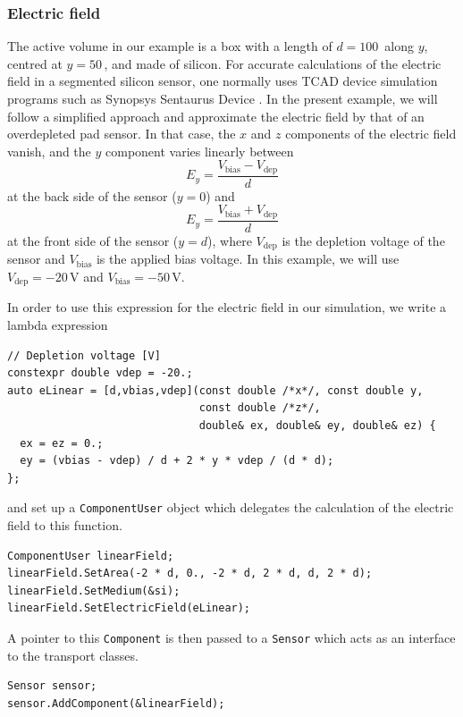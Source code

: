 \subsubsection{Electric field}
The active volume in our example is a box with a length of $d = 100$\, along $y$, centred at $y = 50$\,, and made of silicon. 
For accurate calculations of the electric field in a segmented silicon sensor, 
one normally uses TCAD device simulation programs such as 
Synopsys Sentaurus Device \cite{Synopsys}. 
In the present example, we will follow a simplified approach 
and approximate the electric field by that of an overdepleted pad sensor. 
In that case, the $x$ and $z$ components of the electric field vanish, 
and the $y$ component varies linearly between
\begin{equation*}
E_y = \frac{V_{\text{bias}} - V_{\text{dep}}}{d}
\end{equation*}
at the back side of the sensor ($y = 0$) and
\begin{equation*}
E_y = \frac{V_{\text{bias}} + V_{\text{dep}}}{d}
\end{equation*}
at the front side of the sensor ($y = d$), where 
$V_{\text{dep}}$ is the depletion voltage of the sensor and 
$V_{\text{bias}}$ is the applied bias voltage. 
In this example, we will use $V_{\text{dep}} = -20$\,V and 
$V_{\text{bias}} = -50$\,V.

In order to use this expression for the electric field in our simulation, 
we write a lambda expression
\begin{lstlisting}
// Depletion voltage [V]
constexpr double vdep = -20.;
auto eLinear = [d,vbias,vdep](const double /*x*/, const double y,
                              const double /*z*/,
                              double& ex, double& ey, double& ez) {
  ex = ez = 0.;
  ey = (vbias - vdep) / d + 2 * y * vdep / (d * d);
};
\end{lstlisting}
and set up a \texttt{ComponentUser} object 
which delegates the calculation of the electric field to this function.
\begin{lstlisting}
ComponentUser linearField;
linearField.SetArea(-2 * d, 0., -2 * d, 2 * d, d, 2 * d);
linearField.SetMedium(&si);
linearField.SetElectricField(eLinear);
\end{lstlisting}
A pointer to this \texttt{Component} is then passed to a \texttt{Sensor}
which acts as an interface to the transport classes.
\begin{lstlisting}
Sensor sensor;
sensor.AddComponent(&linearField);
\end{lstlisting}

